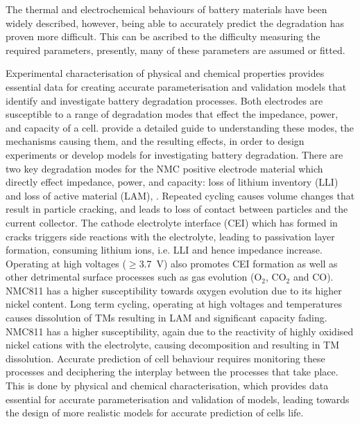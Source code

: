 \documentclass[aps,prb,twocolumn,superscriptaddress,reprint]{revtex4-1}
\begin{document}
The thermal and electrochemical behaviours of battery materials have been widely described, however, being able to accurately predict the degradation has proven more difficult. 
This can be ascribed to the difficulty measuring the required parameters, presently, many of these parameters are assumed or fitted. 

Experimental characterisation of physical and chemical properties provides essential data for creating accurate parameterisation and validation models that identify and investigate  battery degradation processes. 
Both electrodes are susceptible to a range of degradation modes that effect the impedance, power, and capacity of a cell. 
\citeauthor{Edge2021Degradation} provide a detailed guide to understanding these modes, the mechanisms causing them, and the resulting effects, in order to design experiments or develop models for investigating battery degradation.\cite{Edge2021Degradation} 
There are two key degradation modes for the NMC positive electrode material which directly effect impedance, power, and capacity: loss of lithium inventory (LLI) and loss of active material (LAM), .\cite{erickson2017recent,erickson2017recent}
Repeated cycling causes volume changes that result in particle cracking, \cite{Woodford2010} and leads to loss of contact between particles and the current collector.\cite{erickson2017recent} 
The cathode electrolyte interface (CEI) which has formed in cracks triggers side reactions with the electrolyte, leading to passivation layer formation, consuming lithium ions, i.e. LLI and hence impedance increase.\cite{erickson2017recent}
Operating at high voltages ($\geq$3.7~V) also promotes CEI formation as well as other detrimental surface processes such as gas evolution (O$_{2}$, CO$_{2}$ and CO).\cite{jung2017chemical} 
NMC811 has a higher susceptibility towards oxygen evolution due to its higher nickel content.\cite{Phillip2020} 
Long term cycling, operating at high voltages and temperatures causes dissolution of TMs resulting in LAM and significant capacity fading. \cite{li2018temperature} 
NMC811 has a higher susceptibility, again due to the reactivity of highly oxidised nickel cations with the electrolyte, causing decomposition and resulting in TM dissolution.\cite{billy2018dissolution} 
Accurate prediction of cell behaviour requires monitoring these processes and deciphering the interplay between the processes that take place.
This is done by physical and chemical characterisation, which provides data essential for accurate parameterisation and validation of models, leading towards the design of more realistic models for accurate prediction of cells life.
\end{document}
